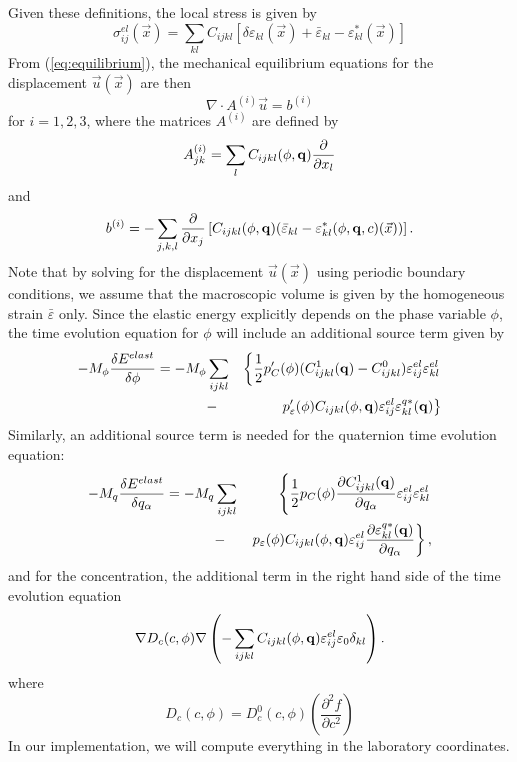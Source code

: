 Given these definitions, the local stress is given by
%
\begin{equation}\label{eq:dsigma}
  \sigma^{el}_{ij}(\vec x)
  =\sum_{kl}C_{ijkl}\left[\delta\varepsilon_{kl}(\vec x)+\bar\varepsilon_{kl}-\varepsilon_{kl}^*(\vec x)\right]
\end{equation}
%
From (\ref{eq:equilibrium}), the mechanical equilibrium equations for
the displacement $\vec u(\vec x)$ are then
%
\begin{equation}\label{eq:equilibrium_i}
  \nabla\cdot A^{(i)}\vec u=b^{(i)}
\end{equation}
%
for $i=1,2,3$, where the matrices $A^{(i)}$ are defined by
%
\begin{equation}\label{eq:Ai}
  A_{jk}^{(i)}=\sum_l C_{ijkl}(\phi,{\bf q})\frac{\partial}{\partial x_l}
\end{equation}
%
and
%
\begin{equation}\label{eq:bi}
  b^{(i)}=-\sum_{j,k,l} \frac{\partial}{\partial x_j}
  \left[C_{ijkl}(\phi,{\bf q})(\bar\varepsilon_{kl}-\varepsilon_{kl}^*(\phi,{\bf q},c)(\vec x))\right].
\end{equation}
%
Note that by solving for the displacement $\vec u(\vec x)$ using
periodic boundary conditions, we assume that the macroscopic volume is
given by the homogeneous strain $\bar\varepsilon$ only.  Since the
elastic energy explicitly depends on the phase variable $\phi$, the
time evolution equation for $\phi$ will include an additional source
term given by
%
\begin{eqnarray}\label{eq:src_elast_phi}
  -M_\phi\frac{\delta E^{elast}}{\delta\phi} =
  -M_\phi & \sum_{ijkl} & 
  \left\{ \frac{1}{2}p'_C(\phi)(C_{ijkl}^1({\bf q}) -C_{ijkl}^0)
  \varepsilon^{el}_{ij}\varepsilon^{el}_{kl} \right. \nonumber \\  
  &-& \left. p'_\varepsilon(\phi)C_{ijkl}(\phi,{\bf q})\varepsilon^{el}_{ij}\varepsilon_{kl}^{q*}({\bf q}) \right\}
\end{eqnarray}
%
Similarly, an additional source term is needed for the quaternion time
evolution equation:
%
\begin{eqnarray}\label{eq:src_elast_q}
  -M_q \frac{\delta E^{elast}}{\delta q_\alpha} =
  -M_q & \sum_{ijkl} & 
  \left\{ \frac{1}{2}p_C(\phi)\frac{\partial C_{ijkl}^1({\bf q})}{\partial q_\alpha} \varepsilon^{el}_{ij}\varepsilon^{el}_{kl} \right. \nonumber
  \\
  &-& \left. p_\varepsilon(\phi) C_{ijkl}(\phi,{\bf q})\varepsilon^{el}_{ij}\frac{\partial\varepsilon_{kl}^{q*}({\bf q})}{\partial q_\alpha} \right\},
\end{eqnarray}
%
and for the concentration, the additional term in the right hand side
of the time evolution equation
%
\begin{equation}\label{eq:src_elast_c}
  \nabla D_c(c,\phi)\nabla \left(
  - \sum_{ijkl} C_{ijkl}(\phi,{\bf q}) \varepsilon^{el}_{ij}\varepsilon_0\delta_{kl} \right).
\end{equation}
%
where
$$
D_c(c,\phi)=D^0_c(c,\phi)\left(\frac{\partial^2 f}{\partial c^2}\right)
$$
In our implementation, we will compute everything in the laboratory
coordinates.

